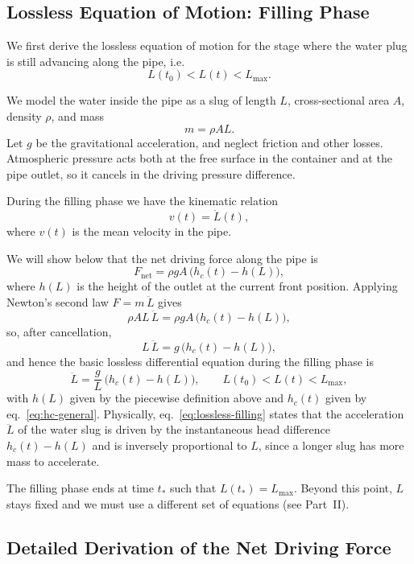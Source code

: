\documentclass[11pt]{article}
\begin{document}
\subsection{Lossless Equation of Motion: Filling Phase}

We first derive the lossless equation of motion for the stage where the water
plug is still advancing along the pipe, i.e.
\[
L(t_0) < L(t) < L_{\max}.
\]

We model the water inside the pipe as a slug of length $L$, cross-sectional area
$A$, density $\rho$, and mass
\[
m = \rho A L.
\]
Let $g$ be the gravitational acceleration, and neglect friction and other losses.
Atmospheric pressure acts both at the free surface in the container and at the
pipe outlet, so it cancels in the driving pressure difference.

During the filling phase we have the kinematic relation
\begin{equation}
  v(t) = \dot L(t),
\end{equation}
where $v(t)$ is the mean velocity in the pipe.

We will show below that the net driving force along the pipe is
\begin{equation}
  F_{\text{net}} = \rho g A \,\bigl(h_c(t) - h(L)\bigr),
\end{equation}
where $h(L)$ is the height of the outlet at the current front position.
Applying Newton's second law $F = m\,\ddot L$ gives
\[
\rho A L \,\ddot L
= \rho g A \,\bigl(h_c(t) - h(L)\bigr),
\]
so, after cancellation,
\[
L \,\ddot L = g \,\bigl(h_c(t) - h(L)\bigr),
\]
and hence the basic lossless differential equation during the filling phase is
\begin{equation}
\ddot L
  = \frac{g}{L}\,\bigl(h_c(t) - h(L)\bigr),
  \qquad L(t_0) < L(t) < L_{\max},
  \label{eq:lossless-filling}
\end{equation}
with $h(L)$ given by the piecewise definition above and $h_c(t)$ given by
eq.~\eqref{eq:hc-general}.  Physically,
eq.~\eqref{eq:lossless-filling} states that the acceleration $\ddot L$ of the
water slug is driven by the instantaneous head difference $h_c(t)-h(L)$ and is
inversely proportional to $L$, since a longer slug has more mass to accelerate.

The filling phase ends at time $t_\ast$ such that $L(t_\ast) = L_{\max}$.
Beyond this point, $L$ stays fixed and we must use a different set of
equations (see Part~II).

\subsection{Detailed Derivation of the Net Driving Force}
\end{document}
